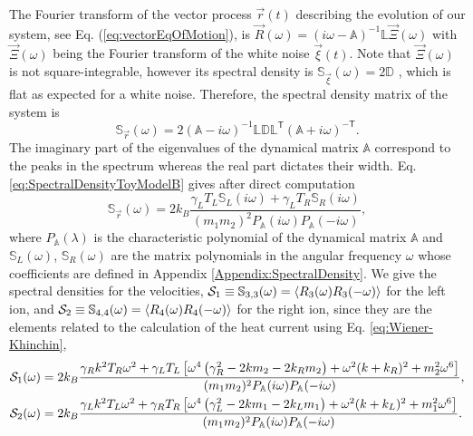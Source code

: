 The Fourier transform of the vector process $\overrightarrow{r}(t)$ describing the evolution of our system, see Eq. (\ref{eq:vectorEqOfMotion}),
is $\overrightarrow{R}(\omega) = \left( i \omega - \mathbb{A} \right)^{-1}\mathbb{L}\overrightarrow{\Xi}(\omega)$ with $\overrightarrow{\Xi}(\omega)$ being the Fourier transform of the white noise $\overrightarrow{\xi}(t)$. Note that $\overrightarrow{\Xi}(\omega)$ is not square-integrable, however its spectral density is $\mathbb{S}_{\overrightarrow{\xi}}(\omega) = 2 \mathbb{D}$ \cite{Sarkka2019}, which is flat as expected for a white noise. Therefore, the spectral density matrix of the system is
%
\begin{equation}
  \mathbb{S}_{\overrightarrow{r}} (\omega)= 2 \left(  \mathbb{A} - i\omega\right)^{-1}\mathbb{L}\mathbb{D}\mathbb{L}^\mathsf{T}\left(  \mathbb{A} + i\omega\right)^{-\mathsf{T}}.
  \label{eq:SpectralDensityToyModelB}
\end{equation}
%
The imaginary part of the eigenvalues of the dynamical matrix $\mathbb{A}$ correspond to the peaks in the spectrum whereas the real part dictates their width. Eq. \eqref{eq:SpectralDensityToyModelB} gives after direct computation
%
\begin{equation}
  \mathbb{S}_{\overrightarrow{r}}(\omega) = 2 k_B \frac{\gamma_L T_L\mathbb{S}_L(i\omega)+\gamma_L T_R\mathbb{S}_R(i\omega)}{(m_1 m_2)^2 P_\mathbb{A}(i\omega)P_\mathbb{A}(-i\omega)},
\end{equation}
%
where $P_\mathbb{A}(\lambda)$ is the characteristic polynomial of the dynamical matrix $\mathbb{A}$ and $\mathbb{S}_L(\omega)$, $\mathbb{S}_R(\omega)$ are the matrix polynomials in the angular frequency $\omega$ whose coefficients are defined in Appendix \ref{Appendix:SpectralDensity}. We give
the spectral densities for the velocities, ${\cal{S}}_1\equiv\mathbb{S}_{3,3}(\omega) = \expval{R_3(\omega)R_3(-\omega)}$ for the left ion, and ${\cal S}_2\equiv\mathbb{S}_{4,4}(\omega) = \expval{R_4(\omega)R_4(-\omega)}$ for the right ion, since they are the elements related to the calculation of the heat current using Eq. \eqref{eq:Wiener-Khinchin},
%
  \begin{align}
    {\cal S}_1(\omega) &= 2 k_B \frac{\gamma_R k^2 T_R \omega ^2+\gamma_L T_L \left[\omega ^4 \left(\gamma_R^2-2 k m_2-2 k_R m_2\right)+\omega ^2 (k+k_R)^2+m_2^2 \omega ^6\right]}{(m_1 m_2)^2 P_\mathbb{A}(i\omega)P_\mathbb{A}(-i\omega)},\nonumber\\
{\cal S}_2(\omega)
&= 2 k_B \frac{\gamma_L k^2 T_L \omega ^2+\gamma_R T_R \left[\omega ^4 \left(\gamma_L^2-2 k m_1-2 k_L m_1\right)+\omega ^2 (k+k_L)^2+m_1^2 \omega ^6\right]}{(m_1 m_2)^2 P_\mathbb{A}(i\omega)P_\mathbb{A}(-i\omega)}.
    \label{eq:SpectralDensitiesVelocities}
  \end{align}
